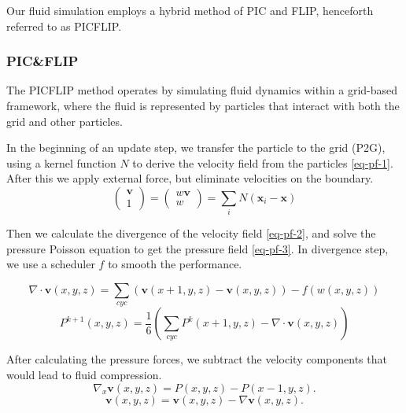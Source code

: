 Our fluid simulation employs a hybrid method of PIC \cite{harlow1964particle} and FLIP, henceforth referred to as PICFLIP. 

\subsubsection{PIC\&FLIP}

The PICFLIP method operates by simulating fluid dynamics within a grid-based framework, where the fluid is represented by particles that interact with both the grid and other particles. 

In the beginning of an update step, we transfer the particle to the grid (P2G), using a kernel function $N$ to derive the velocity field from the particles \eqref{eq-pf-1}. After this we apply external force, but eliminate velocities on the boundary.
\begin{equation}
  \label{eq-pf-1}
  \begin{pmatrix}\mathbf{v}\\1\end{pmatrix}=\begin{pmatrix}w\mathbf{v}\\w\end{pmatrix}=\sum_{i}N(\mathbf{x}_i-\mathbf{x})
\end{equation}

Then we calculate the divergence of the velocity field \eqref{eq-pf-2}, and solve the pressure Poisson equation to get the pressure field \eqref{eq-pf-3}. In divergence step, we use a scheduler $f$ to smooth the performance. 

\begin{equation}
  \label{eq-pf-2}
  \nabla \cdot \mathbf{v}(x,y,z) = \sum_{cyc}(\mathbf{v}(x+1,y,z)-\mathbf{v}(x,y,z))-f(w(x,y,z))
\end{equation}
\begin{equation}
  \label{eq-pf-3}
  P^{k+1}(x,y,z)=\frac{1}{6}\left(\sum_{cyc}P^k(x+1,y,z)-\nabla \cdot \mathbf{v}(x,y,z)\right)
\end{equation}

After calculating the pressure forces, we subtract the velocity components that would lead to fluid compression.
\begin{equation}
  \label{eq-pf-4}
  \nabla_x\mathbf{v}(x,y,z)=P(x,y,z)-P(x-1,y,z).
\end{equation}
\begin{equation}
  \label{eq-pf-5}
  \mathbf{v}(x,y,z)=\mathbf{v}(x,y,z)-\nabla\mathbf{v}(x,y,z).
\end{equation}

